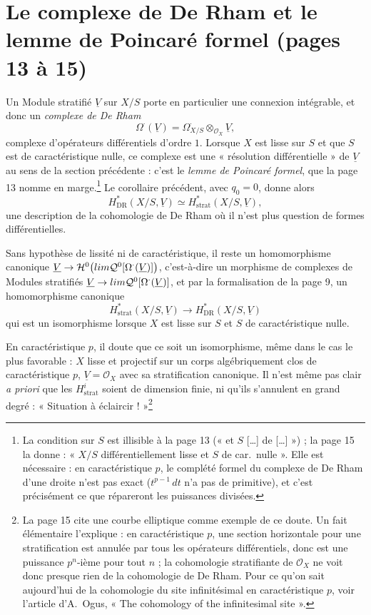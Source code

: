 \documentclass[11pt,a4paper]{article}
\begin{document}
\section*{Le complexe de De Rham et le lemme de Poincaré formel (pages 13 à 15)}

Un Module stratifié $\underline{V}$ sur $X/S$ porte en particulier une
connexion intégrable, et donc un \emph{complexe de De Rham}
\[
  \Omega^{\cdot}(\underline{V}) = \Omega^{\cdot}_{X/S} \otimes_{\mathcal{O}_X}
  \underline{V} ,
\]
complexe d'opérateurs différentiels d'ordre $1$. Lorsque $X$ est lisse sur
$S$ et que $S$ est de caractéristique nulle, ce complexe est une
« résolution différentielle » de $\underline{V}$ au sens de la section
précédente : c'est le \emph{lemme de Poincaré formel}, que la page 13 nomme
en marge.\footnote{La condition sur $S$ est illisible à la page 13 (« et $S$
[\ldots] de [\ldots] ») ; la page 15 la donne : « $X/S$ différentiellement
lisse et $S$ de car.\ nulle ». Elle est nécessaire : en caractéristique $p$,
le complété formel du complexe de De Rham d'une droite n'est pas exact
($t^{p-1}\,dt$ n'a pas de primitive), et c'est précisément ce que
répareront les puissances divisées.} Le corollaire précédent, avec $q_0 = 0$,
donne alors
\[
  H^{*}_{\mathrm{DR}}(X/S, \underline{V}) \simeq
  H^{*}_{\mathrm{strat}}(X/S, \underline{V}) ,
\]
une description de la cohomologie de De Rham où il n'est plus question de
formes différentielles.

Sans hypothèse de lissité ni de caractéristique, il reste un homomorphisme
canonique $\underline{V} \to \mathcal{H}^{0}\bigl(\varprojlim
\mathcal{Q}^{0}[\Omega^{\cdot}(\underline{V})]\bigr)$, c'est-à-dire un
morphisme de complexes de Modules stratifiés
$\underline{V} \to \varprojlim \mathcal{Q}^{0}[\Omega^{\cdot}(\underline{V})]$,
et par la formalisation de la page 9, un homomorphisme canonique
\[
  \boxed{\;
  H^{*}_{\mathrm{strat}}(X/S, \underline{V}) \longrightarrow
  H^{*}_{\mathrm{DR}}(X/S, \underline{V})
  \;}
\]
qui est un isomorphisme lorsque $X$ est lisse sur $S$ et $S$ de
caractéristique nulle.

En caractéristique $p$, il doute que ce soit un isomorphisme, même dans le
cas le plus favorable : $X$ lisse et projectif sur un corps algébriquement
clos de caractéristique $p$, $\underline{V} = \mathcal{O}_X$ avec sa
stratification canonique. Il n'est même pas clair \emph{a priori} que les
$H^{i}_{\mathrm{strat}}$ soient de dimension finie, ni qu'ils s'annulent en
grand degré : « Situation à éclaircir ! »\footnote{La page 15 cite une courbe
elliptique comme exemple de ce doute. Un fait élémentaire l'explique : en
caractéristique $p$, une section horizontale pour une stratification est
annulée par tous les opérateurs différentiels, donc est une puissance
$p^{n}$-ième pour tout $n$ ; la cohomologie stratifiante de $\mathcal{O}_X$
ne voit donc presque rien de la cohomologie de De Rham. Pour ce qu'on sait
aujourd'hui de la cohomologie du site infinitésimal en caractéristique $p$,
voir l'article d'A.~Ogus, « The cohomology of the infinitesimal site ».}
\end{document}
